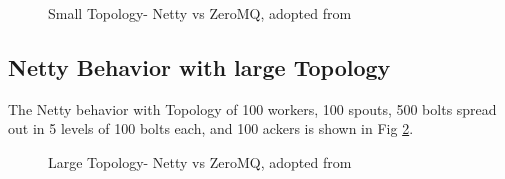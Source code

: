 \documentclass[9pt,twocolumn,twoside]{styles/osajnl}
\begin{document}
\begin{figure}[htbp]
	\centering
	\caption{Small Topology- Netty vs ZeroMQ, adopted from
          \cite{article-storm-netty} }
	\label{fig:nettyvzmq-small}
\end{figure}



\subsection{Netty Behavior with large Topology}
The Netty behavior with Topology of 100 workers, 100 spouts, 500 bolts
spread out in 5 levels of 100 bolts each, and 100 ackers is shown in
Fig \ref{fig:NettyVsZMQFull}.

\begin{figure}[htbp]
	\centering
	\caption{Large Topology- Netty vs ZeroMQ, adopted from
          \cite{article-storm-netty}}
	\label{fig:NettyVsZMQFull}
\end{figure}
\end{document}
